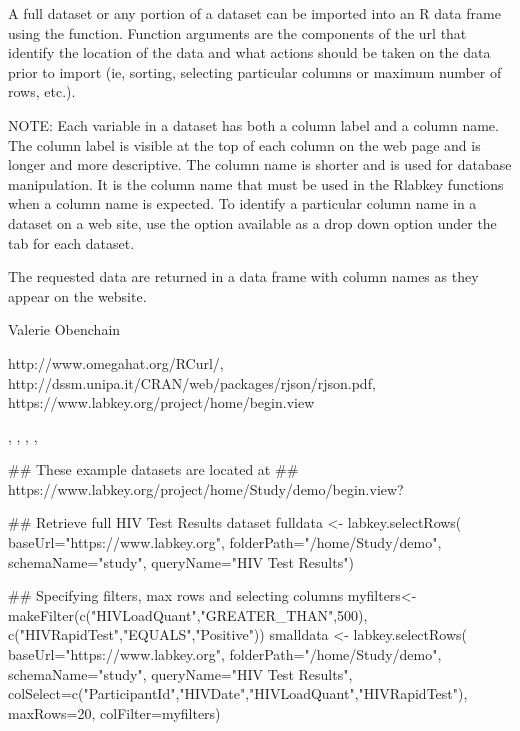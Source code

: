 \documentclass{book}
\begin{document}
\begin{Details}\relax
A full dataset or any portion of a dataset can be imported into an R data frame using the 
 function. Function arguments are the components of the url that identify
the location of the data and what actions should be taken on the data prior to import
(ie, sorting, selecting particular columns or maximum number of rows, etc.).

NOTE: Each variable in a dataset has both a column label and a column name. The column label is visible at the top
of each column on the web page and is longer and more descriptive. The column name is shorter and is
used  for database manipulation. It is the column name that must be used in
the Rlabkey functions when a column name is expected. To identify a particular column name in a dataset on
a web site, use the  option available as a drop down option under the 
tab for each dataset.
\end{Details}
\begin{Value}
The requested data are returned in a data frame with column names as they appear on the website.
\end{Value}
\begin{Author}\relax
Valerie Obenchain
\end{Author}
\begin{References}\relax
http://www.omegahat.org/RCurl/,\\ 
http://dssm.unipa.it/CRAN/web/packages/rjson/rjson.pdf,\\
https://www.labkey.org/project/home/begin.view
\end{References}
\begin{SeeAlso}\relax
{}, , , 
, \\
\end{SeeAlso}
\begin{Examples}
\begin{ExampleCode}
## These example datasets are located at 
## https://www.labkey.org/project/home/Study/demo/begin.view?

## Retrieve full HIV Test Results dataset
fulldata <- labkey.selectRows(  
baseUrl="https://www.labkey.org", 
folderPath="/home/Study/demo", 
schemaName="study", 
queryName="HIV Test Results")

## Specifying filters, max rows and selecting columns
myfilters<- makeFilter(c("HIVLoadQuant","GREATER_THAN",500), 
                                           c("HIVRapidTest","EQUALS","Positive"))
smalldata <- labkey.selectRows( 
baseUrl="https://www.labkey.org", 
folderPath="/home/Study/demo", 
schemaName="study",     
queryName="HIV Test Results", 
colSelect=c("ParticipantId","HIVDate","HIVLoadQuant","HIVRapidTest"), 
maxRows=20,
colFilter=myfilters)


\end{ExampleCode}
\end{Examples}
\end{document}
